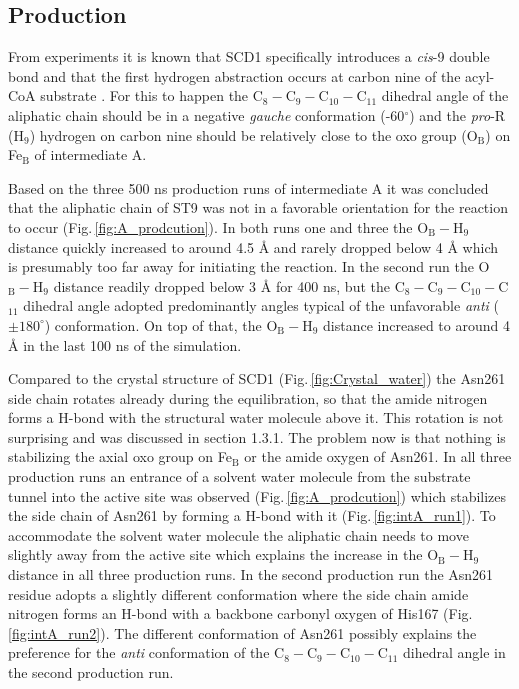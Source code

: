 \subsection{Production}
From experiments it is known that SCD1 specifically introduces a \textit{cis}-9 double bond and that the first hydrogen abstraction occurs at carbon nine of the acyl-CoA substrate \cite{Buist1996}. For this to happen the C$_8-$C$_9-$C$_{10}-$C$_{11}$ dihedral angle of the aliphatic chain should be in a negative \textit{gauche} conformation (-60$^{\circ}$) and the \textit{pro}-R (H$_{9}$) hydrogen on carbon nine should be relatively close to the oxo group (O$_{\text{B}}$) on Fe$_{\text{B}}$ of intermediate A.

Based on the three 500 ns production runs of intermediate A it was concluded that the aliphatic chain of ST9 was not in a favorable orientation for the reaction to occur (Fig.\,\ref{fig:A_prodcution}). In both runs one and three the O$_{\text{B}}-$H$_9$ distance quickly increased to around 4.5 Å and rarely dropped below 4 Å which is presumably too far away for initiating the reaction. In the second run the O$_{\text{B}}-$H$_9$ distance readily dropped below 3 Å for 400 ns, but the C$_8-$C$_9-$C$_{10}-$C$_{11}$ dihedral angle adopted predominantly angles typical of the unfavorable \textit{anti} ($\pm180^{\circ}$) conformation. On top of that, the O$_{\text{B}}-$H$_9$ distance increased to around 4 Å in the last 100 ns of the simulation.

Compared to the crystal structure of SCD1 \cite{Bai2015} (Fig.\,\ref{fig:Crystal_water}) the Asn261 side chain rotates already during the equilibration, so that the amide nitrogen forms a H-bond with the structural water molecule above it. This rotation is not surprising and was discussed in section 1.3.1. The problem now is that nothing is stabilizing the axial oxo group on Fe$_{\text{B}}$ or the amide oxygen of Asn261. In all three production runs an entrance of a solvent water molecule from the substrate tunnel into the active site was observed (Fig.\,\ref{fig:A_prodcution}) which stabilizes the side chain of Asn261 by forming a H-bond with it (Fig.\,\ref{fig:intA_run1}). To accommodate the solvent water molecule the aliphatic chain needs to move slightly away from the active site which explains the increase in the O$_{\text{B}}-$H$_9$ distance in all three production runs. In the second production run the Asn261 residue adopts a slightly different conformation where the side chain amide nitrogen forms an H-bond with a backbone carbonyl oxygen of His167 (Fig.\,\ref{fig:intA_run2}). The different conformation of Asn261 possibly explains the preference for the \textit{anti} conformation of the C$_8-$C$_9-$C$_{10}-$C$_{11}$ dihedral angle in the second production run.

